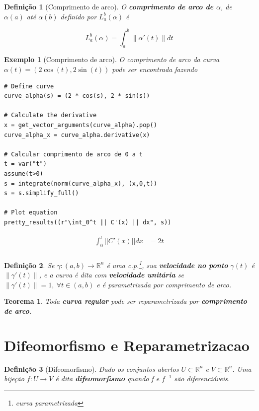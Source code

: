 \documentclass[12pt]{article}
\newtheorem{ex}{Exemplo}[section]
\newtheorem{theorem}{Teorema}
\newtheorem{definition}{Definição}
\begin{document}
\begin{definition}[Comprimento de arco]
O \textbf{comprimento de arco de $\alpha$}, de $\alpha(a)$ até $\alpha(b)$ definido por $L_a^b (\alpha)$ é  

$$L_a^b (\alpha) = \int_a^b \| \alpha'(t) \| d t$$
\end{definition}

\begin{ex}[Comprimento de arco] O comprimento de arco da curva $\alpha(t) = (2 \cos(t), 2 \sin(t))$ pode ser encontrada fazendo
\begin{lstlisting}
# Define curve
curve_alpha(s) = (2 * cos(s), 2 * sin(s))

# Calculate the derivative
x = get_vector_arguments(curve_alpha).pop()
curve_alpha_x = curve_alpha.derivative(x)
    
# Calcular comprimento de arco de 0 a t
t = var("t")
assume(t>0)
s = integrate(norm(curve_alpha_x), (x,0,t))
s = s.simplify_full()

# Plot equation
pretty_results((r"\int_0^t || C'(x) || dx", s))
\end{lstlisting}

\newcommand{\Bold}[1]{\mathbf{#1}}\begin{align*} \int_0^t || C'(x) || dx &= 2t \\ \end{align*}
\end{ex}

\begin{definition}
Se $\gamma: (a, b) \rightarrow \mathbb{R}^n$ é uma c.p.\footnote{curva parametrizada}, sua \textbf{velocidade no ponto} $\gamma(t)$ é $\| \gamma'(t) \|$, e a curva é dita com \textbf{velocidade unitária} se $\| \gamma'(t) \| = 1,\ \forall t \in (a, b)$ e é parametrizada por comprimento de arco.
\end{definition}

\begin{theorem}
Toda \textbf{curva regular} pode ser reparametrizada por \textbf{comprimento de arco}.
\end{theorem}


\section{Difeomorfismo e Reparametrizacao}\label{s3}
\begin{definition}[Difeomorfismo]
Dado os conjuntos abertos $U \subset \mathbb{R}^n$ e $V \subset \mathbb{R}^n$. Uma bijeção $f: U \rightarrow V$ é dita \textbf{difeomorfismo} quando f e $f^{-1}$ são diferenciáveis.
\end{definition}
\end{document}
